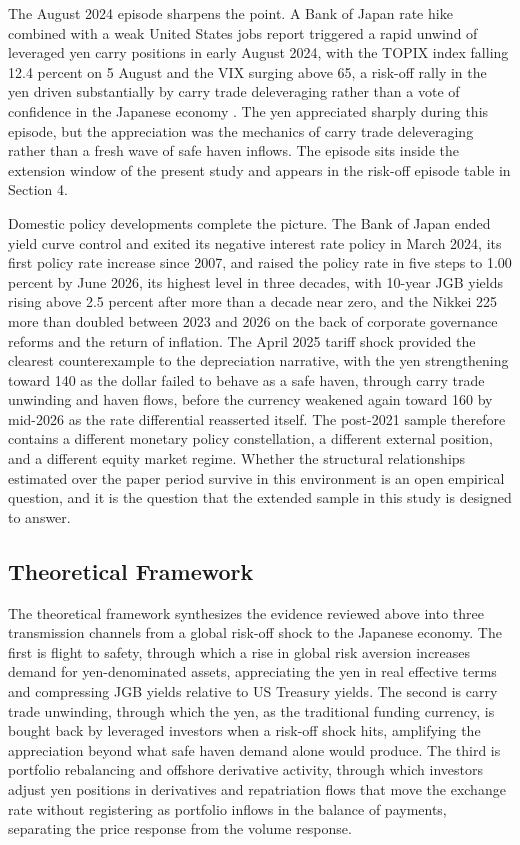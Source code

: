 The August 2024 episode sharpens the point. A Bank of Japan rate hike combined with a weak United States jobs report triggered a rapid unwind of leveraged yen carry positions in early August 2024, with the TOPIX index falling 12.4 percent on 5 August and the VIX surging above 65, a risk-off rally in the yen driven substantially by carry trade deleveraging rather than a vote of confidence in the Japanese economy \parencite{aquilina_lombardi_schrimpf_sushko_2024,bis_2024,imf_2025}. The yen appreciated sharply during this episode, but the appreciation was the mechanics of carry trade deleveraging rather than a fresh wave of safe haven inflows. The episode sits inside the extension window of the present study and appears in the risk-off episode table in Section 4.

Domestic policy developments complete the picture. The Bank of Japan ended yield curve control and exited its negative interest rate policy in March 2024, its first policy rate increase since 2007, and raised the policy rate in five steps to 1.00 percent by June 2026, its highest level in three decades, with 10-year JGB yields rising above 2.5 percent after more than a decade near zero, and the Nikkei 225 more than doubled between 2023 and 2026 on the back of corporate governance reforms and the return of inflation. The April 2025 tariff shock provided the clearest counterexample to the depreciation narrative, with the yen strengthening toward 140 as the dollar failed to behave as a safe haven, through carry trade unwinding and haven flows, before the currency weakened again toward 160 by mid-2026 as the rate differential reasserted itself. The post-2021 sample therefore contains a different monetary policy constellation, a different external position, and a different equity market regime. Whether the structural relationships estimated over the paper period survive in this environment is an open empirical question, and it is the question that the extended sample in this study is designed to answer.

\subsection{Theoretical Framework}

The theoretical framework synthesizes the evidence reviewed above into three transmission channels from a global risk-off shock to the Japanese economy. The first is flight to safety, through which a rise in global risk aversion increases demand for yen-denominated assets, appreciating the yen in real effective terms and compressing JGB yields relative to US Treasury yields. The second is carry trade unwinding, through which the yen, as the traditional funding currency, is bought back by leveraged investors when a risk-off shock hits, amplifying the appreciation beyond what safe haven demand alone would produce. The third is portfolio rebalancing and offshore derivative activity, through which investors adjust yen positions in derivatives and repatriation flows that move the exchange rate without registering as portfolio inflows in the balance of payments, separating the price response from the volume response.

